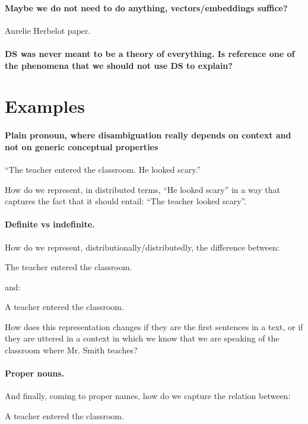 \documentclass[a4paper,12pt]{article}
\begin{document}
\paragraph{Maybe we do not need to do anything,
  vectors/embeddings suffice?} Aurelie Herbelot paper.

\paragraph{DS was never meant to be a theory of
  everything. Is reference one of the phenomena that we
  should not use DS to explain?}

\section{Examples}

\paragraph{Plain
pronoun, where
disambiguation really depends on context and not on generic
conceptual
properties}

``The teacher entered the classroom.
He looked scary.''

How do we represent, in distributed terms, ``He looked
scary'' in a way that
captures the fact that it should entail: ``The teacher
looked scary''.

\paragraph{Definite vs indefinite.}

How do we represent, distributionally/distributedly, the
difference between:

The teacher entered the classroom.

and:

A teacher entered the classroom.

How does this representation changes if they are the first
sentences in a
text, or if they are uttered in a context in which we know
that we are
speaking of the classroom where Mr. Smith teaches?

\paragraph{Proper nouns.}

And finally, coming to proper names, how do we capture the
relation between:

A teacher entered the classroom.
\end{document}

